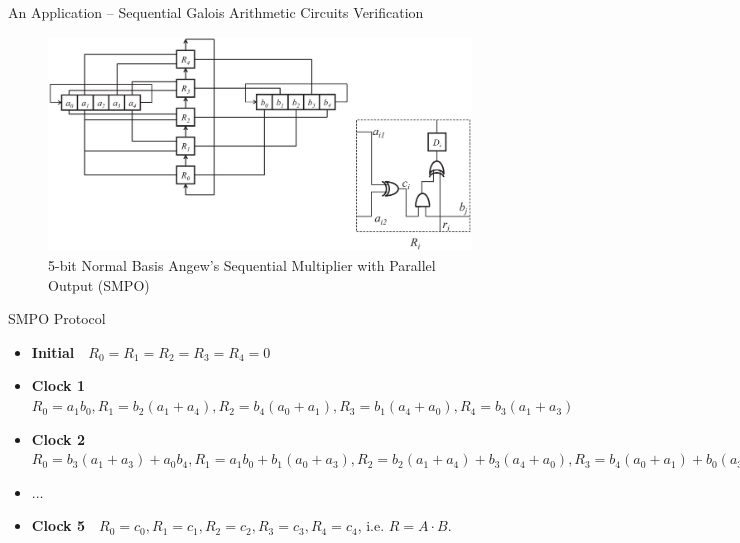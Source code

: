 \documentclass[xcolor=dvipsnames]{beamer}
\begin{document}
\begin{frame}{\large{An Application -- Sequential Galois Arithmetic Circuits Verification}}
\begin{figure}[hbt]
\centerline{
\includegraphics[scale=0.35]{mySMPO.eps}
}
\caption{5-bit Normal Basis Angew's Sequential Multiplier with Parallel Output (SMPO)}
\end{figure}
\end{frame}

\begin{frame}{\large{SMPO Protocol}}
\begin{itemize}
\item \textbf{Initial}\ \ $R_0 = R_1 = R_2 = R_3 = R_4 = 0$
\item \textbf{Clock 1}\ \ $R_0 = a_1b_0, R_1 = b_2(a_1 + a_4), R_2 = b_4(a_0 + a_1), R_3 = b_1(a_4 + a_0), 
			R_4 = b_3(a_1 + a_3)$
\item \textbf{Clock 2}\ \ $R_0 = b_3(a_1 + a_3) + a_0b_4, R_1 = a_1b_0 + b_1(a_0 + a_3), R_2 = b_2(a_1 + a_4)
			+ b_3(a_4 + a_0), R_3 = b_4(a_0 + a_1) + b_0(a_3 + a_4), R_4 = b_1(a_4 + a_0) + b_2(a_0 + a_2)$
\item \textbf{$\dots$}
\item \textbf{Clock 5}\ \ $R_0 = c_0, R_1 = c_1, R_2 = c_2, R_3 = c_3, R_4 = c_4$, i.e. $R = A\cdot B$.
\end{itemize}
\end{frame}
\end{document}
